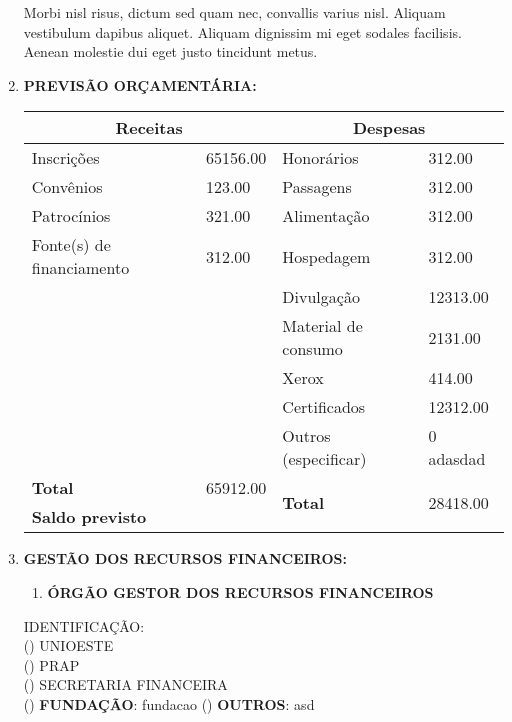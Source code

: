 \documentclass[12pt,a4paper,oneside]{article}%
\begin{document}
\begin{enumerate}
{\begin{mdframed}[innertopmargin=5pt, innerleftmargin=3pt, innerrightmargin=3pt, topline=false]
\newline%
Morbi nisl risus, dictum sed quam nec, convallis varius nisl. Aliquam vestibulum dapibus aliquet. Aliquam dignissim mi eget sodales facilisis. Aenean molestie dui eget justo tincidunt metus.%
\newline%
\end{mdframed}%
}%
\item%
\textbf{PREVISÃO ORÇAMENTÁRIA: \\}%
\begin{tabularx}{\linewidth}{|X|X|X|X|}%
\hline%
\multicolumn{2}{|c|}{\textbf{Receitas}}&\multicolumn{2}{c|}{\textbf{Despesas}}\\%
\hline%
Inscrições&65156.00&Honorários&312.00\\%
\hline%
Convênios&123.00&Passagens&312.00\\%
\hline%
Patrocínios&321.00&Alimentação&312.00\\%
\hline%
Fonte(s) de financiamento&312.00&Hospedagem&312.00\\%
\hline%
&&Divulgação&12313.00\\%
\hline%
&&Material de consumo&2131.00\\%
\hline%
&&Xerox&414.00\\%
\hline%
&&Certificados&12312.00\\%
\hline%
&&Outros (especificar)&0\newline%
adasdad\\%
\hline%
\textbf{Total}&65912.00&\multirow{2}{*}{\textbf{Total}}&\multirow{2}{*}{28418.00}\\%
\cline{1-2}%
\textbf{Saldo previsto}&&&\\%
\hline%
\end{tabularx}%
\item%
\textbf{GESTÃO DOS RECURSOS FINANCEIROS: }%
\noindent%
\begin{enumerate}[leftmargin=7pt]%
\item%
\textbf{ÓRGÃO GESTOR DOS RECURSOS FINANCEIROS \\}%
\end{enumerate}%
\begin{mdframed}%
IDENTIFICAÇÃO: \\%
() UNIOESTE \\%
() PRAP \\%
() SECRETARIA FINANCEIRA \\%
() \textbf{FUNDAÇÃO}: %
fundacao%
\newline%
() \textbf{OUTROS}: %
asd%
\newline%
\end{mdframed}%
\end{enumerate}%
\end{document}
